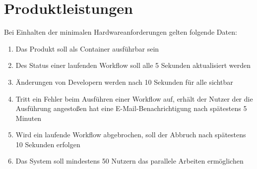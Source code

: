 \chapter{Produktleistungen}
Bei Einhalten der minimalen Hardwareanforderungen gelten folgende Daten:

\renewcommand{\labelenumi}{/PL\arabic{enumi}0/}
\begin{enumerate}
    \setlength\itemsep{-1em}
    \item Das Produkt soll als Container ausführbar sein
    \item Des Status einer laufenden \gls{Workflow} soll alle 5 Sekunden aktualisiert werden
    \item Änderungen von Developern werden nach 10 Sekunden für alle sichtbar
    \item Tritt ein Fehler beim Ausführen einer \gls{Workflow} auf, erhält der Nutzer der die Ausführung angestoßen hat eine E-Mail-Benachrichtigung nach spätestens 5 Minuten
    \item Wird ein laufende \gls{Workflow} abgebrochen, soll der Abbruch nach spätestens 10 Sekunden erfolgen
    \item Das System soll mindestens 50 Nutzern das parallele Arbeiten ermöglichen
    
    
\end{enumerate}